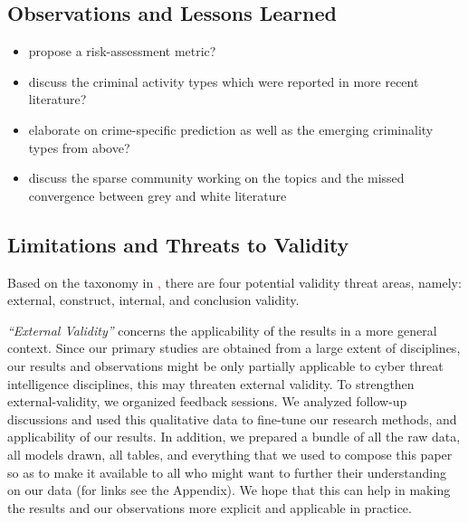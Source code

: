 
\subsection{Observations and Lessons Learned}

\begin{itemize}
\item propose a risk-assessment metric?
\item discuss the criminal activity types which were reported in more recent literature?
\item elaborate on crime-specific prediction as well as the emerging criminality types from above?
\item discuss the sparse community working on the topics and the missed convergence between grey and white literature
\end{itemize}

\subsection{Limitations and Threats to Validity}

Based on the taxonomy in \textcolor{red}{\cite{wohlin}, }there are four potential validity threat areas, namely: external, construct, internal, and conclusion validity. 

\emph{ ``External Validity''} concerns the applicability of the results in a more general context. Since our primary studies are obtained from a large extent of disciplines, our results and observations might be only partially applicable to cyber threat intelligence disciplines, this may threaten external validity. To strengthen external-validity, we organized feedback sessions. We analyzed follow-up discussions and used this qualitative data to fine-tune our research methods, and applicability of our results. In addition, we prepared a bundle of all the raw data, all models drawn, all tables, and everything that we used to compose this paper so as to make it available to all who might want to further their understanding on our data (for links see the Appendix). We hope that this can help in making the results and our observations more explicit and applicable in practice.


